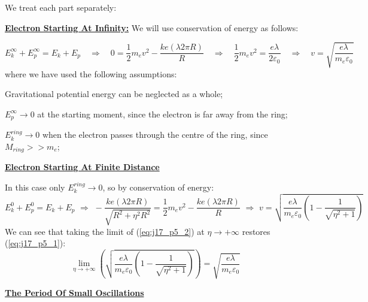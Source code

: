 \newpage
{}
We treat each part separately:
\begin{description}[leftmargin=!, labelwidth=\widthof{$\bullet$}]
	\item[$\bullet$] \textbf{\underline{Electron Starting At Infinity:}} We will use conservation of energy as follows:
	
	\begin{equation*}
		E_k^{\infty} + E_p^{\infty} = E_k + E_p
		\quad\Rightarrow\quad
		0 = \frac{1}{2} m_e v^2 - \frac{ke (\lambda 2 \pi R)}{R}
		\quad\Rightarrow\quad
		\frac{1}{2} m_e v^2 = \frac{e\lambda}{2\varepsilon_0}
		\quad\Rightarrow\quad
		\boxed{
			v = \sqrt{
				\frac{e\lambda}{m_e \varepsilon_0}
			}
		}
		\tag{$1$}
		\label{eq:j17_p5_1}
	\end{equation*}
	where we have used the following assumptions:
	\begin{description}[leftmargin=!, labelwidth=\widthof{$\rightarrow$}]
		\item[$\rightarrow$] Gravitational potential energy can be neglected as a whole;
		\item[$\rightarrow$] $E_p^{\infty} \rightarrow 0$ at the starting moment, since the electron is far away from the ring;
		\item[$\rightarrow$] $E_k^{ring} \rightarrow 0$ when the electron passes through the centre of the ring, since $M_{ring} >> m_e$;
	\end{description}
	\item[$\bullet$] \textbf{\underline{Electron Starting At Finite Distance}}
	
	
	In this case only $E_k^{ring} \rightarrow 0$, so by conservation of energy:
	\begin{equation*}
		E_k^{0} + E_p^{0} = E_k + E_p
		\,\,\Rightarrow\,\,
		-\frac{k e (\lambda 2 \pi R)}{\sqrt{R^2 + \eta^2 R^2}} 
		=
		\frac{1}{2} m_e v^2 - \frac{ke(\lambda 2 \pi R)}{R}
		\,\,\Rightarrow\,\,
		\boxed{
			v
			=
			\sqrt{
				\frac{e \lambda}{m_e \varepsilon_0}
				\left(
				1 - \frac{1}{\sqrt{\eta^2 + 1}}
				\right)
			}
		}
		\tag{$2$}
		\label{eq:j17_p5_2}
	\end{equation*}
	We can see that taking the limit of (\ref{eq:j17_p5_2}) at $\eta \rightarrow +\infty$ restores (\ref{eq:j17_p5_1}):
	\begin{equation*}
		\lim\limits_{\eta \rightarrow + \infty}
		\left(
		\sqrt{
			\frac{e \lambda}{m_e \varepsilon_0}
			\left(
			1 - \frac{1}{\sqrt{\eta^2 + 1}}
			\right)
		}
		\right)
		=
		\sqrt{
			\frac{e \lambda}{m_e \varepsilon_0}
		}
	\end{equation*}
	\item[$\bullet$] \textbf{\underline{The Period Of Small Oscillations}}
	

\end{description}
